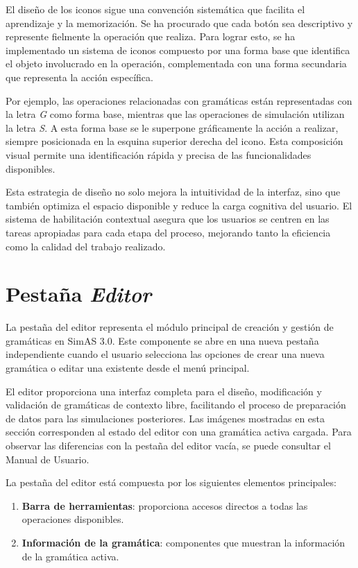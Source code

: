 El diseño de los iconos sigue una convención sistemática que facilita el aprendizaje y la memorización. Se ha procurado que cada botón sea descriptivo y represente fielmente la operación que realiza. Para lograr esto, se ha implementado un sistema de iconos compuesto por una forma base que identifica el objeto involucrado en la operación, complementada con una forma secundaria que representa la acción específica.

Por ejemplo, las operaciones relacionadas con gramáticas están representadas con la letra \textit{G} como forma base, mientras que las operaciones de simulación utilizan la letra \textit{S}. A esta forma base se le superpone gráficamente la acción a realizar, siempre posicionada en la esquina superior derecha del icono. Esta composición visual permite una identificación rápida y precisa de las funcionalidades disponibles.

Esta estrategia de diseño no solo mejora la intuitividad de la interfaz, sino que también optimiza el espacio disponible y reduce la carga cognitiva del usuario. El sistema de habilitación contextual asegura que los usuarios se centren en las tareas apropiadas para cada etapa del proceso, mejorando tanto la eficiencia como la calidad del trabajo realizado.
  

\section{Pestaña \textit{Editor}}

La pestaña del editor representa el módulo principal de creación y gestión de gramáticas en SimAS 3.0. Este componente se abre en una nueva pestaña independiente cuando el usuario selecciona las opciones de crear una nueva gramática o editar una existente desde el menú principal.

El editor proporciona una interfaz completa para el diseño, modificación y validación de gramáticas de contexto libre, facilitando el proceso de preparación de datos para las simulaciones posteriores. Las imágenes mostradas en esta sección corresponden al estado del editor con una gramática activa cargada. Para observar las diferencias con la pestaña del editor vacía, se puede consultar el Manual de Usuario.

La pestaña del editor está compuesta por los siguientes elementos principales:
\begin{enumerate}
 \item \textbf{Barra de herramientas}: proporciona accesos directos a todas las operaciones disponibles.
 \item \textbf{Información de la gramática}: componentes que muestran la información de la gramática activa.
\end{enumerate}

